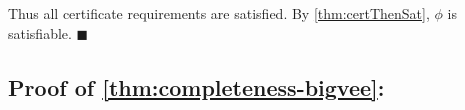 \documentclass[runningheads]{llncs}
\newcommand{\qedhere}{$\blacksquare$}
\newcommand{\subst}[3]{#1[#2\leftarrow #3]}
\newcommand{\repr}[1]{\hat{#1}}
\begin{document}

Thus all certificate requirements are satisfied. By \cref{thm:certThenSat}, $\phi$ is satisfiable.
\qedhere

\subsection*{Proof of \cref{thm:completeness-bigvee}:}
\end{document}

